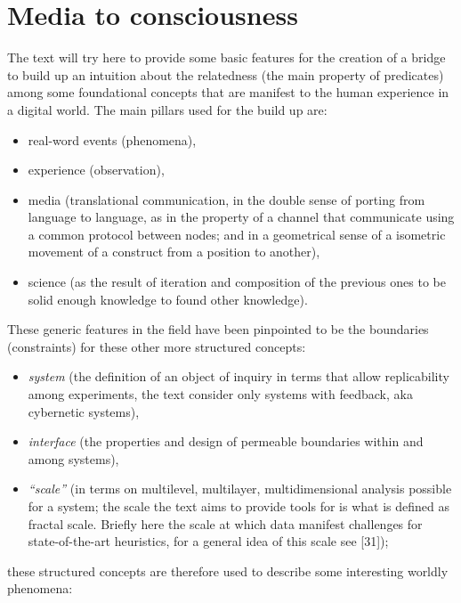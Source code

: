 \documentclass[14pt]{extarticle}
\begin{document}
\section*{Media to consciousness}
\label{sec:media}%

\hspace*{15mm}The text will try here to provide some basic features for the creation of a bridge to build up an intuition about the relatedness (the main property of predicates) among some foundational concepts that are manifest to the human experience in a digital world. The main pillars used for the build up are:
\begin{itemize}
\item real-word events (phenomena),
\item experience (observation),
\item media (translational communication, in the double sense of porting from language to language, as in the property of a channel that communicate using a common protocol between nodes; and in a geometrical sense of a isometric movement of a construct from a position to another),
\item science (as the result of iteration and composition of the previous ones to be solid enough knowledge to found other knowledge).
\end{itemize}
These generic features in the field have been pinpointed to be the boundaries (constraints) for these other more structured concepts:

\begin{itemize}
\item \textit{system} (the definition of an object of inquiry in terms that allow replicability among experiments, the text consider only systems with feedback, aka cybernetic systems),
\item \textit{interface} (the properties and design of permeable boundaries within and among systems), 
\item \textit{“scale”} (in terms on multilevel, multilayer, multidimensional analysis possible for a system; the scale the text aims to provide tools for is what is defined as fractal scale. Briefly here the scale at which data manifest challenges for state-of-the-art heuristics, for a general idea of this scale see [31]);
\end{itemize}

these structured concepts are therefore used to describe some interesting worldly phenomena:
\end{document}
